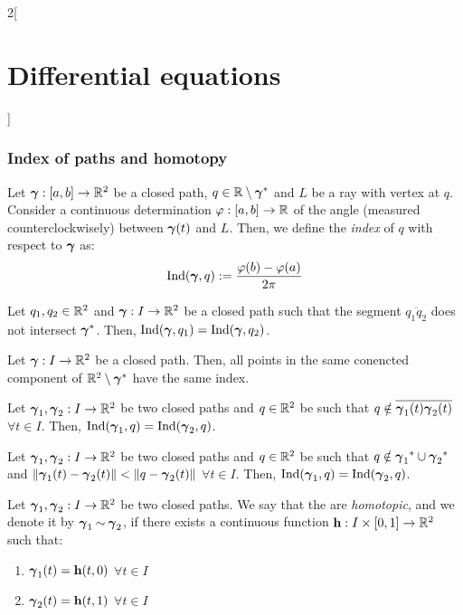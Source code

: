 \documentclass[../../../main.tex]{subfiles}
\begin{document}
\begin{multicols}{2}[\section{Differential equations}]
  \subsubsection{Index of paths and homotopy}
  \begin{definition}
    Let $\boldsymbol{\mathrm{\gamma}}:[a,b]\rightarrow\mathbb{R}^2$ be a closed path, $q\in \mathbb{R}\setminus\boldsymbol{\mathrm{\gamma}}^*$ and $L$ be a ray with vertex at $q$. Consider a continuous determination $\varphi:[a,b]\rightarrow\mathbb{R}$ of the angle (measured counterclockwisely) between $\boldsymbol{\mathrm{\gamma}}(t)$ and $L$. Then, we define the \emph{index} of $q$ with respect to $\boldsymbol{\mathrm{\gamma}}$ as: $$\operatorname{Ind}(\boldsymbol{\mathrm{\gamma}},q):=\frac{\varphi(b)-\varphi(a)}{2\pi}$$
  \end{definition}
  \begin{proposition}
    Let $q_1,q_2\in\mathbb{R}^2$ and $\boldsymbol{\mathrm{\gamma}}:I\rightarrow\mathbb{R}^2$ be a closed path such that the segment $\overline{q_1q_2}$ does not intersect $\boldsymbol{\mathrm{\gamma}}^*$. Then, $\operatorname{Ind}(\boldsymbol{\mathrm{\gamma}},q_1)=\operatorname{Ind}(\boldsymbol{\mathrm{\gamma}},q_2)$.
  \end{proposition}
  \begin{corollary}
    Let $\boldsymbol{\mathrm{\gamma}}:I\rightarrow\mathbb{R}^2$ be a closed path. Then, all points in the same conencted component of $\mathbb{R}^2\setminus\boldsymbol{\mathrm{\gamma}}^*$ have the same index.
  \end{corollary}
  \begin{proposition}
    Let $\boldsymbol{\mathrm{\gamma}}_1,\boldsymbol{\mathrm{\gamma}}_2:I\rightarrow\mathbb{R}^2$ be two closed paths and $q\in\mathbb{R}^2$ be such that $q\notin\overline{\boldsymbol{\mathrm{\gamma}}_1(t)\boldsymbol{\mathrm{\gamma}}_2(t)}$ $\forall t\in I$. Then, $\operatorname{Ind}(\boldsymbol{\mathrm{\gamma}}_1,q)=\operatorname{Ind}(\boldsymbol{\mathrm{\gamma}}_2,q)$.
  \end{proposition}
  \begin{proposition}
    Let $\boldsymbol{\mathrm{\gamma}}_1,\boldsymbol{\mathrm{\gamma}}_2:I\rightarrow\mathbb{R}^2$ be two closed paths and $q\in\mathbb{R}^2$ be such that $q\notin{\boldsymbol{\mathrm{\gamma}}_1}^*\cup{\boldsymbol{\mathrm{\gamma}}_2}^*$ and $\|\boldsymbol{\mathrm{\gamma}}_1(t)-\boldsymbol{\mathrm{\gamma}}_2(t)\|<\|q-\boldsymbol{\mathrm{\gamma}}_2(t)\|$ $\forall t\in I$. Then, $\operatorname{Ind}(\boldsymbol{\mathrm{\gamma}}_1,q)=\operatorname{Ind}(\boldsymbol{\mathrm{\gamma}}_2,q)$.
  \end{proposition}
  \begin{definition}
    Let $\boldsymbol{\mathrm{\gamma}}_1,\boldsymbol{\mathrm{\gamma}}_2:I\rightarrow\mathbb{R}^2$ be two closed paths. We say that the are \emph{homotopic}, and we denote it by $\boldsymbol{\mathrm{\gamma}}_1\mathbin{\sim}\boldsymbol{\mathrm{\gamma}}_2$, if there exists a continuous function $\boldsymbol{\mathrm{h}}:I\times[0,1]\rightarrow\mathbb{R}^2$ such that:
    \begin{enumerate}
      \item $\boldsymbol{\mathrm{\gamma}}_1(t)=\boldsymbol{\mathrm{h}}(t,0)$ $\forall t\in I$
      \item $\boldsymbol{\mathrm{\gamma}}_2(t)=\boldsymbol{\mathrm{h}}(t,1)$ $\forall t\in I$

\end{enumerate}
\end{definition}
\end{multicols}
\end{document}
